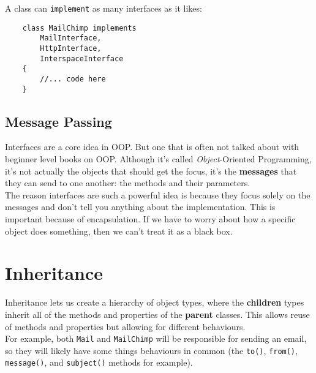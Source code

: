 A class can \texttt{implement} as many interfaces as it likes:

\begin{verbatim}
    class MailChimp implements
        MailInterface,
        HttpInterface,
        InterspaceInterface
    {
        //... code here
    }
\end{verbatim}


\subsection{Message Passing}

Interfaces are a core idea in OOP. But one that is often not talked about with beginner level books on OOP. Although it's called \textit{Object}-Oriented Programming, it's not actually the objects that should get the focus, it's the \textbf{messages} that they can send to one another: the methods and their parameters.
\\

The reason interfaces are such a powerful idea is because they focus solely on the messages and don't tell you anything about the implementation. This is important because of encapsulation. If we have to worry about how a specific object does something, then we can't treat it as a black box.




\section{Inheritance}

Inheritance lets us create a hierarchy of object types, where the \textbf{children} types inherit all of the methods and properties of the \textbf{parent} classes. This allows reuse of methods and properties but allowing for different behaviours.
\\

For example, both \texttt{Mail} and \texttt{MailChimp} will be responsible for sending an email, so they will likely have some things behaviours in common (the \texttt{to()}, \texttt{from()}, \texttt{message()}, and \texttt{subject()} methods for example).
\\

